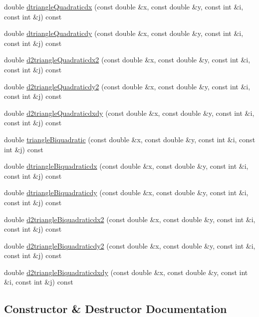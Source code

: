 \begin{DoxyCompactItemize}
\item 
double \mbox{\hyperlink{classfemus_1_1basis_a36ac5b9e572289fb4d552b97dec8a0f1}{dtriangle\+Quadraticdx}} (const double \&x, const double \&y, const int \&i, const int \&j) const
\item 
double \mbox{\hyperlink{classfemus_1_1basis_aa6d822471f1a03034003e0499ca6a2c6}{dtriangle\+Quadraticdy}} (const double \&x, const double \&y, const int \&i, const int \&j) const
\item 
double \mbox{\hyperlink{classfemus_1_1basis_adb2041a297cde6b673e1ae393b4e1abb}{d2triangle\+Quadraticdx2}} (const double \&x, const double \&y, const int \&i, const int \&j) const
\item 
double \mbox{\hyperlink{classfemus_1_1basis_ab4432bf9996b939143fe7a013a397094}{d2triangle\+Quadraticdy2}} (const double \&x, const double \&y, const int \&i, const int \&j) const
\item 
double \mbox{\hyperlink{classfemus_1_1basis_afc53a79c2d4989b204cf69833bd20e91}{d2triangle\+Quadraticdxdy}} (const double \&x, const double \&y, const int \&i, const int \&j) const
\item 
double \mbox{\hyperlink{classfemus_1_1basis_aaf2a0be4f2d29c434293c40f7b268613}{triangle\+Biquadratic}} (const double \&x, const double \&y, const int \&i, const int \&j) const
\item 
double \mbox{\hyperlink{classfemus_1_1basis_aa2007487d021857ff90ba9c3366e54ba}{dtriangle\+Biquadraticdx}} (const double \&x, const double \&y, const int \&i, const int \&j) const
\item 
double \mbox{\hyperlink{classfemus_1_1basis_a0d3f013bbb3a95515bb5c6a84f68eef1}{dtriangle\+Biquadraticdy}} (const double \&x, const double \&y, const int \&i, const int \&j) const
\item 
double \mbox{\hyperlink{classfemus_1_1basis_a065d6f7c99411b8410bde98fcb12a089}{d2triangle\+Biquadraticdx2}} (const double \&x, const double \&y, const int \&i, const int \&j) const
\item 
double \mbox{\hyperlink{classfemus_1_1basis_a823c2c760606dc5ec50bb749a4dbe10e}{d2triangle\+Biquadraticdy2}} (const double \&x, const double \&y, const int \&i, const int \&j) const
\item 
double \mbox{\hyperlink{classfemus_1_1basis_aeebd0fb9806e39c3537021aba7f63f1e}{d2triangle\+Biquadraticdxdy}} (const double \&x, const double \&y, const int \&i, const int \&j) const
\end{DoxyCompactItemize}


\subsection{Constructor \& Destructor Documentation}
\mbox{\label{classfemus_1_1basis_a1e819ab49eb14b0727fb214ede9987c3}} 
